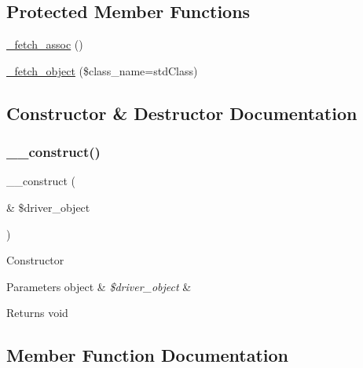 \subsection*{Protected Member Functions}
\begin{DoxyCompactItemize}
\item 
\mbox{\hyperlink{class_c_i___d_b__sqlsrv__result_a43a9a92817f1334a1c10752ec44275a0}{\+\_\+fetch\+\_\+assoc}} ()
\item 
\mbox{\hyperlink{class_c_i___d_b__sqlsrv__result_a60806be6a9c2488820813c2a7f4fef71}{\+\_\+fetch\+\_\+object}} (\$class\+\_\+name=\textquotesingle{}std\+Class\textquotesingle{})
\end{DoxyCompactItemize}


\subsection{Constructor \& Destructor Documentation}
\mbox{\label{class_c_i___d_b__sqlsrv__result_a8e093c8b6e5733bc3f306385ee426ab7}} 
\subsubsection{\texorpdfstring{\+\_\+\+\_\+construct()}{\_\_construct()}}
{\footnotesize\ttfamily \+\_\+\+\_\+construct (\begin{DoxyParamCaption}\item[{\&}]{\$driver\+\_\+object }\end{DoxyParamCaption})}

Constructor


\begin{DoxyParams}[1]{Parameters}
object & {\em \$driver\+\_\+object} & \\
\hline
\end{DoxyParams}
\begin{DoxyReturn}{Returns}
void 
\end{DoxyReturn}


\subsection{Member Function Documentation}
\mbox{\label{class_c_i___d_b__sqlsrv__result_a43a9a92817f1334a1c10752ec44275a0}} 
